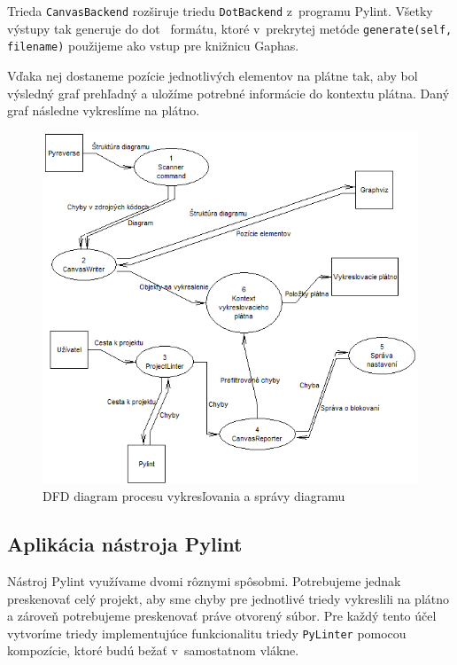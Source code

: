\documentclass[11pt,oneside,final]{fithesis2}
\begin{document}
			Trieda \texttt{CanvasBackend} rozširuje triedu \texttt{DotBackend} z~programu Pylint. Všetky výstupy tak generuje do dot~\cite{dotformat} formátu, ktoré v~prekrytej metóde \texttt{generate(self, filename)} použijeme ako vstup pre knižnicu Gaphas. 
			
			Vďaka nej dostaneme pozície jednotlivých elementov na plátne tak, aby bol výsledný graf prehľadný a uložíme potrebné informácie do kontextu plátna. Daný graf následne vykreslíme na plátno.
	

	\begin{figure}[htb]
	 \centering
	 \includegraphics[width=\textwidth]{images/dfd_diagram}
	 \caption{DFD diagram procesu vykresľovania a správy diagramu}
	\end{figure}

	
		\subsection{Aplikácia nástroja Pylint}

		Nástroj Pylint využívame dvomi rôznymi spôsobmi. Potrebujeme jednak preskenovať celý projekt, aby sme chyby pre jednotlivé triedy vykreslili na plátno a zároveň potrebujeme preskenovať práve otvorený súbor. Pre každý tento účel vytvoríme triedy implementujúce funkcionalitu triedy \texttt{PyLinter} pomocou kompozície, ktoré budú bežať v~samostatnom vlákne. 
		
\end{document}
